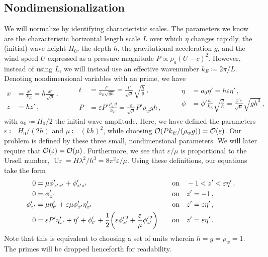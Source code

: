 \documentclass{jfm}
\DeclareMathOperator{\Ur}{Ur}
\renewcommand*{\epsilon}{\varepsilon}
\begin{document}
\subsection{Nondimensionalization}
We will normalize by identifying characteristic scales.
The parameters we know \apriori are the characteristic horizontal length
scale $L$ over which $\eta$ changes rapidly, the (initial) wave height
$H_0$, the depth $h$, the gravitational acceleration $g$, and the wind
speed $U$ expressed as a pressure magnitude $P \propto \rho_a (U-c)^2$.
However, instead of using $L$, we will instead use an effective
wavenumber $k_E \coloneqq 2 \pi/ L$.
Denoting nondimensional variables with an prime, we have
\begin{equation*}
  \begin{aligned}
  x &= \frac{x'}{k_E} = h \frac{x'}{\sqrt{\mu}}\,, \\
  z &= h z' \,,
  \end{aligned}
  \qquad
  \begin{aligned}
  t &= \frac{t'}{k_E\sqrt{g h}}
    = \frac{t'}{\sqrt{\mu}} \sqrt{\frac{h}{g}} \,, \\
  P &= \epsilon P' \frac{\rho_w g}{k_E}
    = \frac{\epsilon}{\sqrt{\mu}} P' \rho_w g h \,,
  \end{aligned}
  \qquad
  \begin{aligned}
  \eta &= a_0 \eta' = h \epsilon \eta' \,, \\
  \phi &= \phi'\frac{a_0}{k_E}\sqrt{\frac{g}{h}}
    = \frac{\phi'\epsilon}{\sqrt{\mu}}\sqrt{g h^3} \,,
  \end{aligned}
\end{equation*}
with $a_0 \coloneqq H_0/2$ the initial wave amplitude.
Here, we have defined the parameters $\epsilon \coloneqq H_0/(2h)$ and $\mu
\coloneqq (kh)^2$, while choosing $\order{P k_E/(\rho_w g)} =
\order{\epsilon}$.
Our problem is defined by these three small, nondimensional parameters.
We will later require that $\order{\epsilon} = \order{\mu}$.
Furthermore, we see that $\epsilon/\mu$ is proportional to the Ursell
number, $\Ur = H \lambda^2/h^3 = 8 \pi^2 \epsilon/\mu$.
Using these definitions, our equations take the form
\begin{alignat}{2}
  0 &= \mu \phi'_{x'x'} + \phi'_{z'z'} &&\qq{on}
    -1 < z' < \epsilon \eta' \,, \label{eq:laplace_nondim} \\
  0 &= \phi'_{z'} &&\qq{on} z'=-1 \,, \label{eq:bottom_bc_nondim} \\
  \phi'_{z'} &= \mu \eta'_{t'} +
    \epsilon \mu \phi'_{x'} \eta'_{x'} &&\qq{on} z' = \epsilon \eta' \,,
    \label{eq:kinematic_bc_nondim} \\
  0 &= \epsilon P' \eta'_{x'} +  \eta' + \phi'_{t'} + \frac{1}{2}
    \pqty{\epsilon \phi_{x'}^{\prime \, 2} + \frac{\epsilon}{\mu}
    \phi_{z'}^{\prime \, 2}} &&\qq{on} z'= \epsilon \eta' \,.
    \label{eq:dynamic_bc_nondim}
\end{alignat}
Note that this is equivalent to choosing a set of units wherein $h = g =
\rho_w = 1$.
The primes will be dropped henceforth for readability.
\end{document}
